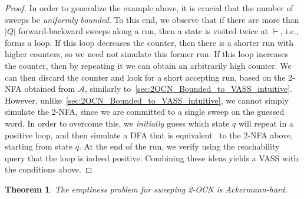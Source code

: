\documentclass[11pt,a4paper]{amsart}
\newtheorem{theorem}{Theorem}
\theoremstyle{definition}
\newcommand{\lmark}{\vdash}
\newcommand{\cA}{\mathcal{A}}
\begin{document}
\begin{proof}
	In order to generalize the example above, it is crucial that the number of
	sweeps be \emph{uniformly bounded}. To this end, we observe that if there are
	more than $|Q|$ forward-backward sweeps along a run, then a state is visited
	twice at $\lmark$, i.e., forms a loop. If this loop decreases the counter, then
	there is a shorter run with higher counters, so we need not simulate this former
	run.  If this loop increases the counter, then by repeating it we can obtain an
	arbitrarily high counter. We can then discard the counter and look for a short
	accepting run, based on the 2-NFA obtained from $\cA$, similarly
	to~\cref{sec:2OCN_Bounded_to_VASS_intuitive}.  However,
	unlike~\cref{sec:2OCN_Bounded_to_VASS_intuitive}, we cannot simply simulate the
	2-NFA, since we are committed to a single sweep on the guessed word. In order to
	overcome this, we \emph{initially} guess which state \(q\) will repeat in a positive loop,
	and then simulate a DFA that is
	equivalent~\cite{shepherdson1959reduction,rabin1959finite,vardi1989note} to the
	2-NFA above, starting from state $q$. At the end of the run, we verify using the
	reachability query that the loop is indeed positive.
	Combining these ideas yields a VASS with the conditions above.
\end{proof}
%

\begin{theorem}
	\label{lem:ackermann_hard_sweeping} The emptiness problem for sweeping
	2-OCN is Ackermann-hard.
\end{theorem}
\end{document}
